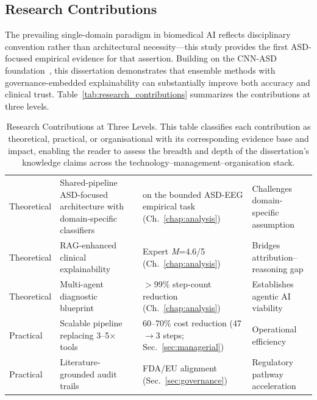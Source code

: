 \subsection{Research Contributions}

The prevailing single-domain paradigm in biomedical AI reflects disciplinary convention rather than architectural necessity---this study provides the first ASD-focused empirical evidence for that assertion. Building on the CNN-ASD foundation~\cite{asthana2025cnnasd_icsit}, this dissertation demonstrates that ensemble methods with governance-embedded explainability can substantially improve both accuracy and clinical trust. Table~\ref{tab:research_contributions} summarizes the contributions at three levels.

\begin{table}[!htbp]
\tablestripes\tablefontsize
\tablefontsize
\caption[Research Contributions at Three Levels]{Research Contributions at Three Levels. This table classifies each contribution as theoretical, practical, or organisational with its corresponding evidence base and impact, enabling the reader to assess the breadth and depth of the dissertation's knowledge claims across the technology--management--organisation stack.}
\begin{tabularx}{\textwidth}{@{} >{\raggedright\arraybackslash}p{1.5cm} L L >{\raggedright\arraybackslash}p{1.8cm} @{}}
\toprule
{} &  &  &  \\
\midrule
Theoretical & Shared-pipeline ASD-focused architecture with domain-specific classifiers & \asdacc{} on the bounded ASD-EEG empirical task (Ch.~\ref{chap:analysis}) & Challenges domain-specific assumption \\
\addlinespace
Theoretical & RAG-enhanced clinical explainability & Expert \textit{M}=4.6/5 (Ch.~\ref{chap:analysis}) & Bridges attribution--reasoning gap \\
\addlinespace
Theoretical & Multi-agent diagnostic blueprint & $>$99\% step-count reduction (Ch.~\ref{chap:analysis}) & Establishes agentic AI viability \\
\addlinespace
Practical & Scalable pipeline replacing 3--5$\times$ tools & 60--70\% cost reduction (47$\to$3 steps; Sec.~\ref{sec:managerial}) & Operational efficiency \\
\addlinespace
Practical & Literature-grounded audit trails & FDA/EU alignment (Sec.~\ref{sec:governance}) & Regulatory pathway acceleration \\

\end{tabularx}
\end{table}
